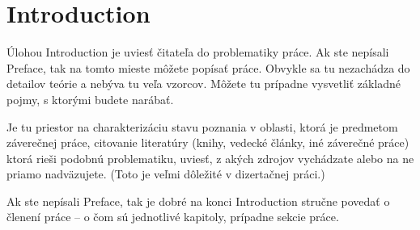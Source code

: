 \chapter{Introduction}

Úlohou Introduction je uviesť čitateľa do problematiky práce. Ak ste nepísali Preface, tak na tomto mieste môžete popísať práce. Obvykle sa tu nezachádza do detailov teórie a nebýva tu veľa vzorcov. Môžete tu prípadne vysvetliť základné pojmy, s ktorými budete narábať.

Je tu priestor na charakterizáciu stavu poznania v oblasti, ktorá je predmetom záverečnej práce, citovanie literatúry (knihy, vedecké články, iné záverečné práce) ktorá rieši podobnú problematiku, uviesť, z akých zdrojov vychádzate alebo na ne priamo nadväzujete. (Toto je veľmi dôležité v dizertačnej práci.)

Ak ste nepísali Preface, tak je dobré  na konci Introduction stručne povedať o členení práce -- o čom sú jednotlivé kapitoly, prípadne sekcie práce.

